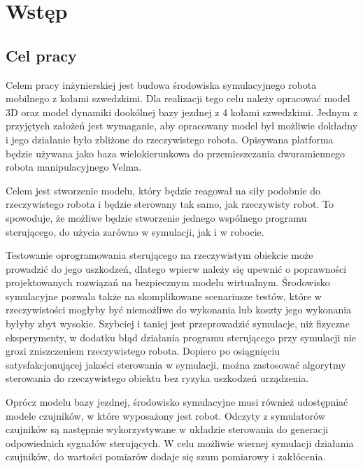 \chapter{Wstęp}
\label{sec:description}
	\section{Cel pracy}
	Celem pracy inżynierskiej jest budowa środowiska symulacyjnego robota mobilnego z kołami szwedzkimi.
	Dla realizacji tego celu należy opracować model 3D oraz model dynamiki dookólnej bazy jezdnej z 4 kołami szwedzkimi.
	Jednym z przyjętych założeń jest wymaganie, aby opracowany model był możliwie dokładny i jego działanie było zbliżone do rzeczywistego robota.
	Opisywana platforma będzie używana jako baza wielokierunkowa do przemieszczania dwuramiennego robota manipulacyjnego Velma.

	Celem jest stworzenie modelu, który będzie reagował na siły podobnie do rzeczywistego robota i będzie sterowany tak samo, jak rzeczywisty robot.
	To spowoduje, że możliwe będzie stworzenie jednego wspólnego programu sterującego, do użycia zarówno w symulacji, jak i w robocie.

	Testowanie oprogramowania sterującego na rzeczywistym obiekcie może prowadzić do jego uszkodzeń, 
	dlatego wpierw należy się upewnić o poprawności projektowanych rozwiązań na bezpiecznym modelu wirtualnym.
	Środowisko symulacyjne pozwala także na skomplikowane scenariusze testów, które w rzeczywistości mogłyby być niemożliwe do wykonania lub koszty jego wykonania byłyby zbyt wysokie.
	Szybciej i taniej jest przeprowadzić symulacje, niż fizyczne eksperymenty, w dodatku błąd działania programu sterującego przy symulacji nie grozi zniszczeniem rzeczywistego robota.
	Dopiero po osiągnięciu satysfakcjonującej jakości sterowania w symulacji, 
	można zastosować algorytmy sterowania do rzeczywistego obiektu bez ryzyka uszkodzeń urządzenia.

	Oprócz modelu bazy jezdnej, środowisko symulacyjne musi również udostępniać modele czujników, w które wyposażony jest robot. 
	Odczyty z symulatorów czujników są następnie wykorzystywane w układzie sterowania do generacji odpowiednich sygnałów sterujących.
	W celu możliwie wiernej symulacji działania czujników, do wartości pomiarów dodaje się szum pomiarowy i zakłócenia.


